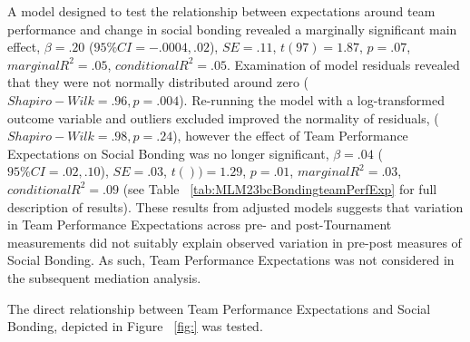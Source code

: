   A model designed to test the relationship between expectations around team performance and change in social bonding revealed a marginally significant main effect, $\beta = .20$ ($95\% CI =  -.0004, .02$), $SE = .11$, $t(97) = 1.87$, $p = .07$, $marginal R^2 = .05$, $conditional R^2 = .05$.  Examination of model residuals revealed that they were not normally distributed around zero ($Shapiro-Wilk = .96, p = .004$).  Re-running the model with a log-transformed outcome variable and outliers excluded improved the normality of residuals, ($Shapiro-Wilk = .98, p = .24$), however the effect of Team Performance Expectations on Social Bonding was no longer significant, $\beta = .04$ ($95\% CI =  .02, .10$), $SE = .03$, $t()) = 1.29$, $p = .01$, $marginal R^2 = .03$, $conditional R^2 = .09$ (see Table ~\ref{tab:MLM23bcBondingteamPerfExp} for full description of results).
  These results from adjusted models suggests that variation in Team Performance Expectations across pre- and post-Tournament measurements did not suitably explain observed variation in pre-post measures of Social Bonding.  As such, Team Performance Expectations was not considered in the subsequent mediation analysis.

  
  \restoregeometry







  The direct relationship between Team Performance Expectations and Social Bonding, depicted in Figure ~\ref{fig:} was tested.

